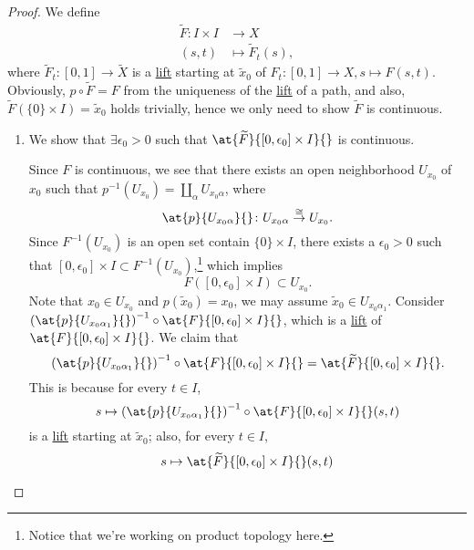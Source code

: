 \begin{proof}
	We define
	\[
		\begin{split}
			\widetilde{F} \colon I\times I &\to X\\
			(s, t)&\mapsto \widetilde{F} _{t} (s),
		\end{split}
	\]
	where \(\widetilde{F} _{t} \colon [0, 1]\to \widetilde{X}\) is a \hyperref[def:lift]{lift} starting at \(\widetilde{x} _0\) of \(F_{t} \colon [0, 1]\to X, s\mapsto F(s, t)\).
	Obviously, \(p\circ \widetilde{F} = F\) from the uniqueness of the \hyperref[def:lift]{lift} of a path, and also, \(\widetilde{F} (\{0\}\times I) = \widetilde{x} _0\)
	holds trivially, hence we only need to show \(\widetilde{F} \) is continuous.
	\begin{enumerate}[(1)]
		\item We show that \(\exists \epsilon _0>0\) such that \(\at{\widetilde{F} }{[0, \epsilon _0]\times I}{} \) is continuous.
		      \begin{figure}[H]
			      \centering
			      \label{fig:pf:col:lec14-5}
		      \end{figure}
		      Since \(F\) is continuous, we see that there exists an open neighborhood \(U_{x_0}\) of \(x_0\) such that \(p^{-1} (U_{x_0})= \coprod_\alpha U_{x_0 \alpha } \), where
		      \[
			      \at{p}{U_{x_0 \alpha }}{} \colon U_{x_0 \alpha }\overset{\cong }{\to } U_{x_0}.
		      \]
		      Since \(F^{-1} (U_{x_0})\) is an open set contain \(\{0\}\times I\), there exists a \(\epsilon _0>0\) such that \([0, \epsilon _0]\times I\subset F^{-1} (U_{x_0})\),\footnote{Notice that we're working on product topology here.}
		      which implies
		      \[
			      F\left([0, \epsilon _0]\times I\right)\subset U_{x_0}.
		      \]
		      Note that \(x_0\in U_{x_0}\) and \(p(\widetilde{x} _0) = x_0\), we may assume \(\widetilde{x} _0\in U_{x_0 \alpha _1}\). Consider \(\left(\at{p}{U_{x_0 \alpha _1}}{} \right)^{-1} \circ \at{F}{[0, \epsilon _0]\times I}{} \),
		      which is a \hyperref[def:lift]{lift} of \(\at{F}{[0, \epsilon _0]\times I}{} \). We claim that
		      \[
			      \left(\at{p}{U_{x_0 \alpha _1}}{} \right)^{-1} \circ \at{F}{[0, \epsilon _0]\times I}{} = \at{\widetilde{F} }{[0, \epsilon _0]\times I}{}.
		      \]
		      This is because for every \(t\in I\),
		      \[
			      s\mapsto \left(\at{p}{U_{x_0 \alpha _1}}{} \right)^{-1} \circ \at{F}{[0, \epsilon _0]\times I}{}(s, t)
		      \]
		      is a \hyperref[def:lift]{lift} starting at \(\widetilde{x} _0\); also, for every \(t\in I\),
		      \[
			      s\mapsto \at{\widetilde{F}}{[0, \epsilon _0]\times I}{}(s, t)
\]
\end{enumerate}
\end{proof}
